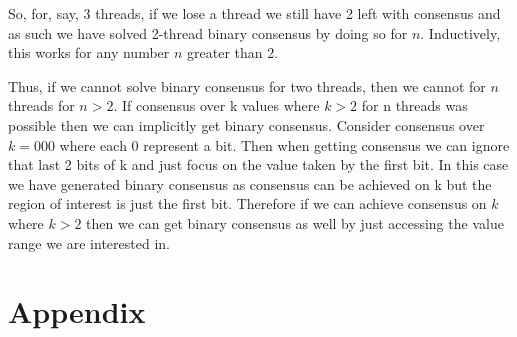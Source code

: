 \documentclass[11pt,letterpaper]{exam}
\begin{document}
\begin{questions}
			So, for, say, 3 threads, if we lose a thread we still have 2 left with consensus and as such we have solved 2-thread binary consensus by doing so for $n$.
			Inductively, this works for any number $n$ greater than 2.
			
			Thus, if we cannot solve binary consensus for two threads, then we cannot for $n$ threads for $n>2$.
		\question
			If consensus over k values where $k>2$ for n threads was possible then we can implicitly get binary consensus. Consider consensus over $k=000$ where each 0 represent a bit. Then when getting consensus we can ignore that last 2 bits of k and just focus on the value taken by the first bit. In this case we have generated binary consensus as consensus can be achieved on k but the region of interest is just the first bit. Therefore if we can achieve consensus on $k$ where $k>2$ then we can get binary consensus as well by just accessing the value range we are interested in.
	\end{questions}

	\section*{Appendix}
	
\end{document}
